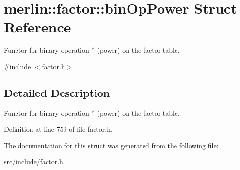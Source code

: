 \hypertarget{structmerlin_1_1factor_1_1binOpPower}{}\section{merlin\+:\+:factor\+:\+:bin\+Op\+Power Struct Reference}
\label{structmerlin_1_1factor_1_1binOpPower}


Functor for binary operation $^\wedge$ (power) on the factor table.  




{\ttfamily \#include $<$factor.\+h$>$}



\subsection{Detailed Description}
Functor for binary operation $^\wedge$ (power) on the factor table. 

Definition at line 759 of file factor.\+h.



The documentation for this struct was generated from the following file\+:\begin{DoxyCompactItemize}
\item 
src/include/\hyperlink{factor_8h}{factor.\+h}\end{DoxyCompactItemize}
